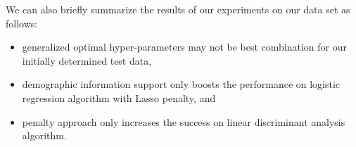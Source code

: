 We can also briefly summarize the results of our experiments on our data set as follows:
\begin{itemize}
    \item generalized optimal hyper-parameters may not be best combination for our initially determined test data,
    \item demographic information support only boosts the performance on logistic regression algorithm with Lasso penalty, and
    \item penalty approach only increases the success on linear discriminant analysis algorithm.
\end{itemize}